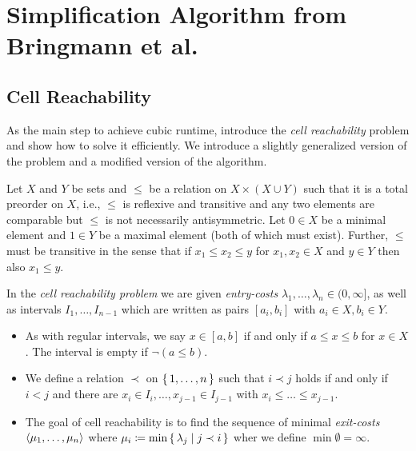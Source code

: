 \section{Simplification Algorithm from Bringmann et al.}
\label{sec:cubic_algo}


\subsection{Cell Reachability}
\label{ssec:cell_reachability}
As the main step to achieve cubic runtime, \citeauthor{polyline_simplification_has_cubic_complexity_bringmannetal} introduce the \emph{cell reachability} problem and show how to solve it efficiently. We introduce a slightly generalized version of the problem and a modified version of the algorithm. 

\begin{definition}
	Let \(X\) and \(Y\) be sets and \(\leq\) be a relation on \(X \times (X \cup Y)\) such that it is a total preorder on \(X\), i.e., \(\leq\) is reflexive and transitive and any two elements are comparable but \(\leq\) is not necessarily antisymmetric. Let \(0\in X\) be a minimal element and \(1\in Y\) be a maximal element (both of which must exist). Further, \(\leq\) must be transitive in the sense that if \(x_1 \leq x_2 \leq y\) for \(x_1, x_2 \in X\) and \(y \in Y\) then also \(x_1 \leq y\).

	In the \emph{cell reachability problem} we are given \emph{entry-costs} \(\lambda_1, \dots, \lambda_n \in (0, \infty]\), as well as intervals \(I_1, \dots, I_{n-1}\) which are written as pairs \([a_i, b_i]\) with \(a_i \in X, b_i \in Y\). 

	\begin{itemize}
		\item As with regular intervals, we say \(x \in [a, b]\) if and only if \(a \leq x \leq b\) for \(x \in X\). The interval is empty  if \(\lnot (a \leq b)\). 
	  
		\item We define a relation \(\prec\) on \(\set{1, \dots, n}\) such that \(i \prec j\) holds if and only if \(i < j\) and there are \(x_i \in I_i, \dots, x_{j-1} \in I_{j-1}\) with \(x_i \leq \dots \leq x_{j - 1}\).

		\item The goal of cell reachability is to find the sequence of minimal \emph{exit-costs} \(\left\langle\mu_1, \dots, \mu_n\right\rangle\) where \(\mu_i \coloneq \min \set{ \lambda_j \mid j \prec i}\) wher we define \(\min \emptyset = \infty\).
	\end{itemize}
\end{definition}

